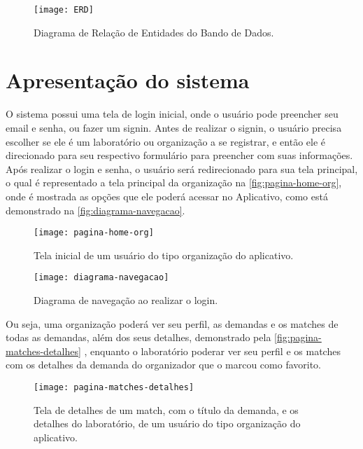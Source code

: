 \begin{figure}[htpb]
    \captionsetup{width=0.43\textwidth}
    \caption{Diagrama de Relação de Entidades do Bando de Dados.}
    \label{fig:ERD}
    \texttt{[image: ERD]}
    \fonte{}
\end{figure}


\section{Apresentação do sistema}\label{sec:apresentacaoSistema}

O sistema possui uma tela de login inicial, onde o usuário pode preencher seu email e senha, ou fazer um signin. Antes de realizar o signin, o usuário precisa escolher se ele é um laboratório ou organização a se registrar, e então ele é direcionado para seu respectivo formulário para preencher com suas informações.
Após realizar o login e senha, o usuário será redirecionado para sua tela principal, o qual é representado a tela principal da organização na \autoref{fig:pagina-home-org}, onde é mostrada as opções que ele poderá acessar no Aplicativo, como está demonstrado na \autoref{fig:diagrama-navegacao}.

\begin{figure}[htpb]
    \captionsetup{width=0.43\textwidth}
    \caption{Tela inicial de um usuário do tipo organização do aplicativo.}
    \label{fig:pagina-home-org}
    \texttt{[image: pagina-home-org]}
    \fonte{}
\end{figure}

\begin{figure}[htpb]
    \captionsetup{width=0.43\textwidth}
    \caption{Diagrama de navegação ao realizar o login.}
    \label{fig:diagrama-navegacao}
    \texttt{[image: diagrama-navegacao]}
    \fonte{}
\end{figure}

Ou seja, uma organização poderá ver seu perfil, as demandas e os matches de todas as demandas, além dos seus detalhes, demonstrado pela \autoref{fig:pagina-matches-detalhes} , enquanto o laboratório poderar ver seu perfil e os matches com os detalhes da demanda do organizador que o marcou como favorito.

\begin{figure}[htpb]
    \captionsetup{width=0.43\textwidth}
    \caption{Tela de detalhes de um match, com o título da demanda, e os detalhes do laboratório, de um usuário do tipo organização do aplicativo.}
    \label{fig:pagina-matches-detalhes}
    \texttt{[image: pagina-matches-detalhes]}
    \fonte{}
\end{figure}


